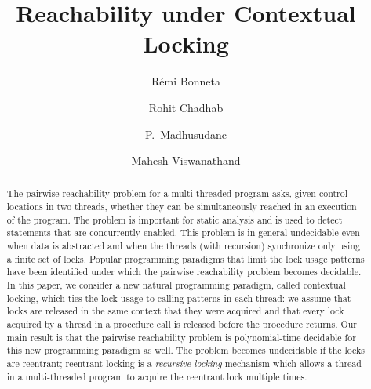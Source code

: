 \documentclass{LMCS}
\begin{document}
\title[Reachability under Contextual Locking]{Reachability under Contextual Locking\rsuper*}

\author[R.~Bonnet]{R\'emi Bonnet\rsuper a}
\address{{\lsuper a}LSV, ENS Cachan \& CNRS, France}

\author[R.~Chadha]{Rohit Chadha\rsuper b}
\address{{}University of Missouri, U.S.A.}

\author[P.~Madhusudan]{P.~Madhusudan\rsuper c}
\address{\vspace{-6 pt}}

\author[M.~Viswanathan]{Mahesh Viswanathan\rsuper d}
\address{\vspace{-6 pt}}



\maketitle

\begin{abstract}
The pairwise reachability problem for a multi-threaded program asks,
given control locations in two threads, whether they can be simultaneously reached in
an execution of the program. The problem is important for static
analysis and is used to detect statements that are concurrently enabled. This
problem is in general undecidable even when data is abstracted and
when the threads (with recursion) synchronize only using a finite set of locks. 
Popular programming paradigms that limit the lock usage patterns have been identified
under which the pairwise reachability problem becomes decidable. In
this paper, we consider a new natural programming paradigm, called contextual locking,
which ties the lock usage to calling patterns in each thread: we assume that locks are released in the same context that they were acquired and that every lock acquired by a thread in
a procedure call is released before the procedure returns. Our
main result is that the pairwise reachability problem is polynomial-time 
decidable for this new programming paradigm as well. The problem becomes undecidable if the locks are
reentrant; reentrant locking is a \emph{recursive locking} mechanism which allows a thread in a multi-threaded program 
to acquire the reentrant lock multiple times.  \end{abstract}
\end{document}
